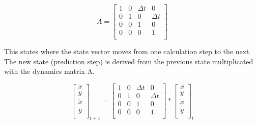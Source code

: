 \begin{equation}
A = \begin{bmatrix} 
1 & 0 & \Delta{t} & 0 \\
0 & 1 & 0 & \Delta{t} \\
0 & 0 & 1 & 0 \\
0 & 0 & 0 & 1 \\
\end{bmatrix}
\end{equation}



This states where the state vector moves from one calculation step to the next. The new state (prediction step) is derived from the previous state multiplicated with the dynamics matrix A.

\begin{equation}
\begin{bmatrix} 
x \\
y \\
\dot{x} \\
\dot{y} \\
\end{bmatrix}_{t +1} 
= \begin{bmatrix} 
1 & 0 & \Delta{t} & 0 \\
0 & 1 & 0 & \Delta{t} \\
0 & 0 & 1 & 0 \\
0 & 0 & 0 & 1 \\
\end{bmatrix}
*
\begin{bmatrix} 
x \\
y \\
\dot{x} \\
\dot{y} \\
\end{bmatrix}_{t}
\end{equation}



